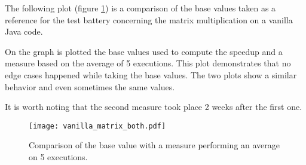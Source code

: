 The following plot (figure \ref{fig plot matrix both}) is a comparison of the base values taken as a reference for the  test battery concerning the matrix multiplication on a vanilla Java code.

On the graph is plotted the base values used to compute the speedup and a measure based on the average of 5 executions. This plot demonstrates that no edge cases happened while taking the base values. The two plots show a similar behavior and even sometimes the same values.

It is worth noting that the second measure took place 2 weeks after the first one.

\begin{figure}[h!]
\centering
\texttt{[image: vanilla\_matrix\_both.pdf]}
\caption{Comparison of the base value with a measure performing an average on 5 executions.}
\label{fig plot matrix both}
\end{figure}